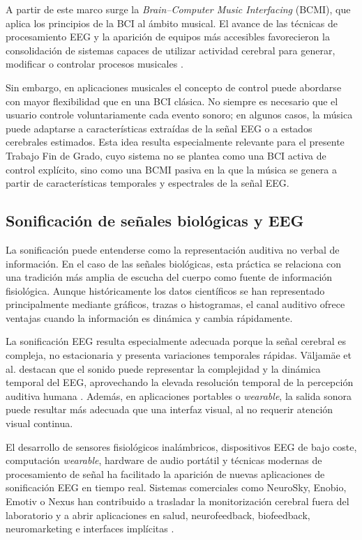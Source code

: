 \documentclass[../main.tex]{subfiles}
\begin{document}
A partir de este marco surge la \textit{Brain--Computer Music Interfacing} (BCMI), que aplica los principios de la BCI al ámbito musical. El avance de las técnicas de procesamiento EEG y la aparición de equipos más accesibles favorecieron la consolidación de sistemas capaces de utilizar actividad cerebral para generar, modificar o controlar procesos musicales \cite{MirandaCastet2014Preface}.

Sin embargo, en aplicaciones musicales el concepto de control puede abordarse con mayor flexibilidad que en una BCI clásica. No siempre es necesario que el usuario controle voluntariamente cada evento sonoro; en algunos casos, la música puede adaptarse a características extraídas de la señal EEG o a estados cerebrales estimados. Esta idea resulta especialmente relevante para el presente Trabajo Fin de Grado, cuyo sistema no se plantea como una BCI activa de control explícito, sino como una BCMI pasiva en la que la música se genera a partir de características temporales y espectrales de la señal EEG.

\subsection{Sonificación de señales biológicas y EEG}

La sonificación puede entenderse como la representación auditiva no verbal de información. En el caso de las señales biológicas, esta práctica se relaciona con una tradición más amplia de escucha del cuerpo como fuente de información fisiológica. Aunque históricamente los datos científicos se han representado principalmente mediante gráficos, trazas o histogramas, el canal auditivo ofrece ventajas cuando la información es dinámica y cambia rápidamente.

La sonificación EEG resulta especialmente adecuada porque la señal cerebral es compleja, no estacionaria y presenta variaciones temporales rápidas. Väljamäe et al. destacan que el sonido puede representar la complejidad y la dinámica temporal del EEG, aprovechando la elevada resolución temporal de la percepción auditiva humana \cite{Valjamae2013EEGSonification}. Además, en aplicaciones portables o \textit{wearable}, la salida sonora puede resultar más adecuada que una interfaz visual, al no requerir atención visual continua.

El desarrollo de sensores fisiológicos inalámbricos, dispositivos EEG de bajo coste, computación \textit{wearable}, hardware de audio portátil y técnicas modernas de procesamiento de señal ha facilitado la aparición de nuevas aplicaciones de sonificación EEG en tiempo real. Sistemas comerciales como NeuroSky, Enobio, Emotiv o Nexus han contribuido a trasladar la monitorización cerebral fuera del laboratorio y a abrir aplicaciones en salud, neurofeedback, biofeedback, neuromarketing e interfaces implícitas \cite{Valjamae2013EEGSonification}.
\end{document}
